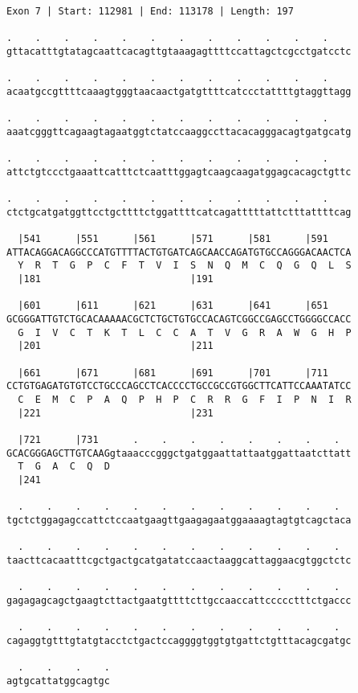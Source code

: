 \documentclass{article}
\begin{document}
\begin{Verbatim}
Exon 7 | Start: 112981 | End: 113178 | Length: 197
 
.    .    .    .    .    .    .    .    .    .    .    .    
gttacatttgtatagcaattcacagttgtaaagagttttccattagctcgcctgatcctc
  
.    .    .    .    .    .    .    .    .    .    .    .    
acaatgccgttttcaaagtgggtaacaactgatgttttcatccctattttgtaggttagg
  
.    .    .    .    .    .    .    .    .    .    .    .    
aaatcgggttcagaagtagaatggtctatccaaggccttacacagggacagtgatgcatg
  
.    .    .    .    .    .    .    .    .    .    .    .    
attctgtccctgaaattcatttctcaatttggagtcaagcaagatggagcacagctgttc
  
.    .    .    .    .    .    .    .    .    .    .    .    
ctctgcatgatggttcctgcttttctggattttcatcagatttttattctttattttcag
  
  |541      |551      |561      |571      |581      |591    
ATTACAGGACAGGCCCATGTTTTACTGTGATCAGCAACCAGATGTGCCAGGGACAACTCA
  Y  R  T  G  P  C  F  T  V  I  S  N  Q  M  C  Q  G  Q  L  S
  |181                          |191                        
  
  |601      |611      |621      |631      |641      |651    
GCGGGATTGTCTGCACAAAAACGCTCTGCTGTGCCACAGTCGGCCGAGCCTGGGGCCACC
  G  I  V  C  T  K  T  L  C  C  A  T  V  G  R  A  W  G  H  P
  |201                          |211                        
  
  |661      |671      |681      |691      |701      |711    
CCTGTGAGATGTGTCCTGCCCAGCCTCACCCCTGCCGCCGTGGCTTCATTCCAAATATCC
  C  E  M  C  P  A  Q  P  H  P  C  R  R  G  F  I  P  N  I  R
  |221                          |231                        
  
  |721      |731      .    .    .    .    .    .    .    .  
GCACGGGAGCTTGTCAAGgtaaacccgggctgatggaattattaatggattaatcttatt
  T  G  A  C  Q  D                                          
  |241                                                      
  
  .    .    .    .    .    .    .    .    .    .    .    .  
tgctctggagagccattctccaatgaagttgaagagaatggaaaagtagtgtcagctaca
  
  .    .    .    .    .    .    .    .    .    .    .    .  
taacttcacaatttcgctgactgcatgatatccaactaaggcattaggaacgtggctctc
  
  .    .    .    .    .    .    .    .    .    .    .    .  
gagagagcagctgaagtcttactgaatgttttcttgccaaccattccccctttctgaccc
  
  .    .    .    .    .    .    .    .    .    .    .    .  
cagaggtgtttgtatgtacctctgactccaggggtggtgtgattctgtttacagcgatgc
  
  .    .    .    .
agtgcattatggcagtgc
\end{Verbatim}
\end{document}
